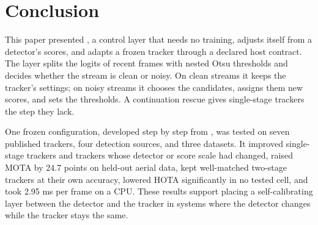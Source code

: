 \section{Conclusion}\label{sec:conclusion}

This paper presented \scl{}, a control layer that needs no training, adjusts
itself from a detector's scores, and adapts a frozen tracker through a
declared host contract. The layer splits the logits of recent frames with
nested Otsu thresholds and decides whether the stream is clean or noisy. On
clean streams it keeps the tracker's settings; on noisy streams it chooses
the candidates, assigns them new scores, and sets the thresholds. A
continuation rescue gives single-stage trackers the step they lack.

One frozen configuration, developed step by step from \aob{}, was tested on
seven published trackers, four detection sources, and three datasets. It
improved single-stage trackers and trackers whose detector or score scale had
changed, raised MOTA by 24.7 points on held-out aerial data, kept well-matched
two-stage trackers at their own accuracy, lowered HOTA significantly in no
tested cell, and took 2.95 ms per frame on a CPU. These results support placing a self-calibrating
layer between the detector and the tracker in systems where the detector
changes while the tracker stays the same.
